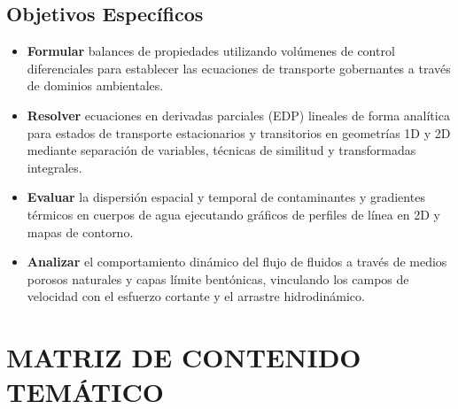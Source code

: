 \subsection{Objetivos Específicos}
\begin{itemize}
    \item \textbf{Formular} balances de propiedades utilizando volúmenes de control diferenciales para establecer las ecuaciones de transporte gobernantes a través de dominios ambientales.
\item \textbf{Resolver} ecuaciones en derivadas parciales (EDP) lineales de forma analítica para estados de transporte estacionarios y transitorios en geometrías 1D y 2D mediante separación de variables, técnicas de similitud y transformadas integrales.
\item \textbf{Evaluar} la dispersión espacial y temporal de contaminantes y gradientes térmicos en cuerpos de agua ejecutando gráficos de perfiles de línea en 2D y mapas de contorno.
\item \textbf{Analizar} el comportamiento dinámico del flujo de fluidos a través de medios porosos naturales y capas límite bentónicas, vinculando los campos de velocidad con el esfuerzo cortante y el arrastre hidrodinámico.
\end{itemize}

\newpage

\section{MATRIZ DE CONTENIDO TEMÁTICO}


